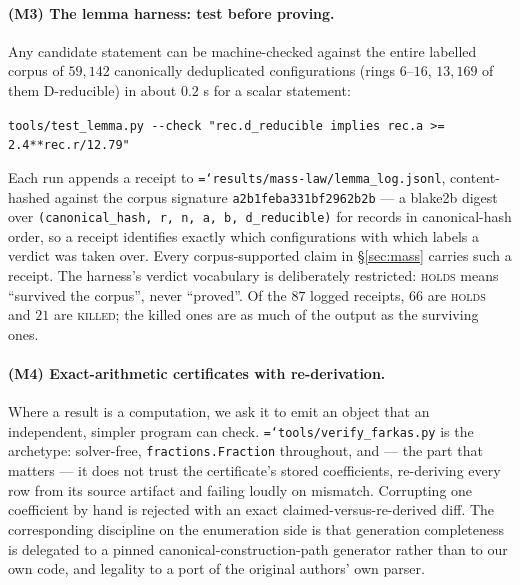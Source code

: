\documentclass[11pt]{article}
\theoremstyle{definition}
\newcommand{\art}[1]{{\texttt{\hyphenchar\font=`\-\relax #1}}}
\begin{document}
\paragraph{(M3) The lemma harness: test before proving.} Any candidate statement can
be machine-checked against the entire labelled corpus of $59{,}142$ canonically
deduplicated configurations (rings $6$--$16$, $13{,}169$ of them D-reducible)
in about $0.2$ s for a scalar statement:
\begin{center}\small
\texttt{tools/test\_lemma.py -{}-check "rec.d\_reducible implies rec.a >= 2.4**rec.r/12.79"}
\end{center}
Each run appends a receipt to \art{results/mass-law/lemma\_log.jsonl}, content-hashed
against the corpus signature \texttt{a2b1feba331bf2962b2b} --- a blake2b digest over
\texttt{(canonical\_hash, r, n, a, b, d\_reducible)} for records in canonical-hash
order, so a receipt identifies exactly which configurations with which labels a
verdict was taken over. Every corpus-supported claim in \S\ref{sec:mass} carries such
a receipt. The harness's verdict vocabulary is deliberately restricted: \textsc{holds}
means ``survived the corpus'', never ``proved''. Of the $87$ logged receipts, $66$ are
\textsc{holds} and $21$ are \textsc{killed}; the killed ones are as much of the
output as the surviving ones.

\paragraph{(M4) Exact-arithmetic certificates with re-derivation.} Where a result is
a computation, we ask it to emit an object that an independent, simpler program can
check. \art{tools/verify\_farkas.py} is the archetype: solver-free,
\texttt{fractions.Fraction} throughout, and --- the part that matters --- it does not
trust the certificate's stored coefficients, re-deriving every row from its source
artifact and failing loudly on mismatch. Corrupting one coefficient by hand is
rejected with an exact claimed-versus-re-derived diff. The corresponding discipline
on the enumeration side is that generation completeness is delegated to a pinned
canonical-construction-path generator \cite{brinkmann2007} rather than to our own
code, and legality to a port of the original authors' own parser.
\end{document}
